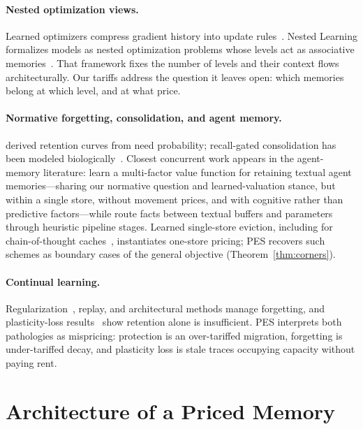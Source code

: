 \documentclass[10pt,twocolumn]{article}
\theoremstyle{definition}
\newcommand{\PES}{PES}
\begin{document}
\paragraph{Nested optimization views.}
Learned optimizers compress gradient history into update rules~\citep{veeriah2021discovery}. Nested Learning
formalizes models as nested optimization problems whose levels act as associative
memories~\citep{behrouz2025nested}. That framework fixes the number of levels and their context flows
architecturally. Our tariffs address the question it leaves open: which memories belong at which level, and
at what price.

\paragraph{Normative forgetting, consolidation, and agent memory.}
\citet{anderson1991rational} derived retention curves from need probability; recall-gated consolidation has
been modeled biologically~\citep{gershman2025recallgated}. Closest concurrent work appears in the
agent-memory literature: \citet{chen2026learning} learn a multi-factor value function for retaining textual
agent memories---sharing our normative question and learned-valuation stance, but within a single store,
without movement prices, and with cognitive rather than predictive factors---while \citet{li2026duallayer}
route facts between textual buffers and parameters through heuristic pipeline stages. Learned single-store
eviction, including for chain-of-thought caches~\citep{zhang2025obcache,li2026ngc}, instantiates one-store
pricing; \PES{} recovers such schemes as boundary cases of the general objective
(Theorem~\ref{thm:corners}).

\paragraph{Continual learning.}
Regularization~\citep{kirkpatrick2017ewc,zenke2017si}, replay, and architectural methods manage forgetting,
and plasticity-loss results~\citep{dohare2024plasticity} show retention alone is insufficient. \PES{}
interprets both pathologies as mispricing: protection is an over-tariffed migration, forgetting is
under-tariffed decay, and plasticity loss is stale traces occupying capacity without paying rent.
\section{Architecture of a Priced Memory}\label{sec:architecture}
\end{document}
